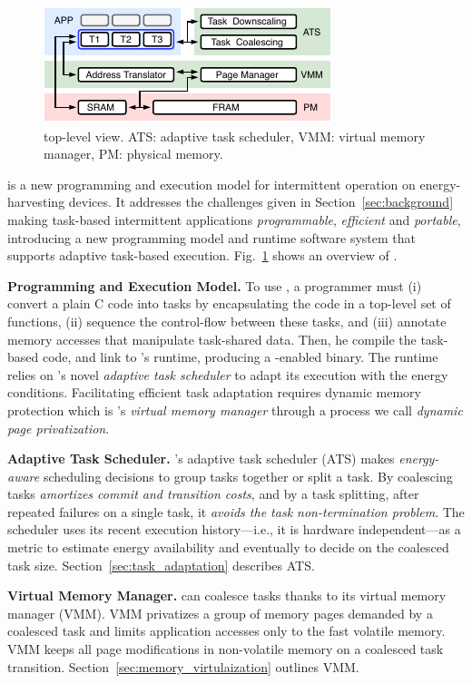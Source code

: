 \begin{figure}
	\centering
	\includegraphics[width=\columnwidth]{figures/system-overview.pdf}
	\caption{\sys top-level view. ATS: adaptive task scheduler, VMM: virtual memory manager, PM: physical memory.}
	\label{fig:system_overview}
\end{figure}

\sys is a new programming and execution model for intermittent operation on energy-harvesting devices. It addresses the challenges given in Section~\ref{sec:background} making task-based intermittent applications {\em programmable}, {\em efficient} and {\em portable}, introducing a new programming model and runtime software system that supports adaptive task-based execution. Fig.~\ref{fig:system_overview} shows an overview of \sys.

\textbf{Programming and Execution Model.}  To use \sys, a programmer must (i) convert a plain C code into tasks by encapsulating the code in a top-level set of functions, (ii) sequence the control-flow between these tasks, and (iii) annotate memory accesses that manipulate task-shared data. Then, he compile the task-based code, and link to \sys's runtime, producing a \sys-enabled binary. The runtime relies on \sys's novel {\em adaptive task scheduler} to adapt its execution with the energy conditions. Facilitating efficient task adaptation requires dynamic memory protection which is \sys's \emph{virtual memory manager} through a process we call \emph{dynamic page privatization}. 

\textbf{Adaptive Task Scheduler.} \sys's adaptive task scheduler (ATS) makes \emph{energy-aware} scheduling decisions to group tasks together or split a task. By coalescing tasks \sys \emph{amortizes commit and transition costs}, and by a task splitting, after repeated failures on a single task, it \emph{avoids the task non-termination problem}. The scheduler uses its recent execution history---i.e., it is hardware independent---as a metric to estimate energy availability and eventually to decide on the coalesced task size. Section~\ref{sec:task_adaptation} describes ATS.

\textbf{Virtual Memory Manager.} \sys can coalesce tasks thanks to its virtual memory manager (VMM). VMM privatizes a group of memory pages demanded by a coalesced task and limits application accesses only to the fast volatile memory. VMM keeps all page modifications in non-volatile memory on a coalesced task transition. Section~\ref{sec:memory_virtulaization} outlines VMM.
